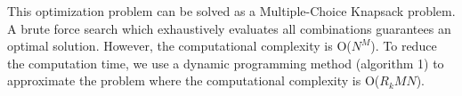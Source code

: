 This optimization problem can be solved as a Multiple-Choice Knapsack problem. A brute force search which exhaustively evaluates all combinations guarantees an optimal solution. However, the computational complexity is O($N^M$). To reduce the computation time, we use a dynamic programming method (algorithm 1) to approximate the problem where the computational complexity is O($R_kMN$).
